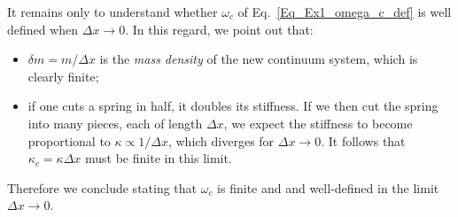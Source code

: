 \begin{sol}
    It remains only to understand whether $\omega_c$ of Eq.~\eqref{Eq_Ex1_omega_c_def} is well defined when $\Delta x \to 0$. In this regard, we point out that:
    \begin{itemize}
        \item $\delta m = m/\Delta x$ is the \textit{mass density} of the new continuum system, which is clearly finite;
    
        \item if one cuts a spring in half, it doubles its stiffness. If we then cut the spring into many pieces, each of length $\Delta x$, we expect the stiffness to become proportional to $\kappa \propto 1/\Delta x$, which diverges for $\Delta x \to 0$. It follows that $\kappa_c = \kappa \Delta x$ must be finite in this limit. 
    \end{itemize}
    Therefore we conclude stating that $\omega_c$ is finite and and well-defined in the limit $\Delta x \to 0$.
\end{sol}